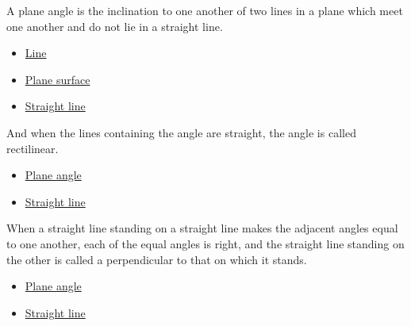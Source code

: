 \begin{definition}
\label{def:euclid-plane-angle}
A plane angle is the inclination to one another of two lines in a plane which
meet one another and do not lie in a straight line.
\end{definition}
\begin{lra-not-visible}
\begin{dependencies}
\begin{itemize}
  \item \hyperref[def:euclid-line]{Line}
  \item \hyperref[def:euclid-plane-surface]{Plane surface}
  \item \hyperref[def:euclid-straight-line]{Straight line}
\end{itemize}
\end{dependencies}
\end{lra-not-visible}

\begin{definition}
\label{def:euclid-rectilinear-angle}
And when the lines containing the angle are straight, the angle is called
rectilinear.
\end{definition}
\begin{lra-not-visible}
\begin{dependencies}
\begin{itemize}
  \item \hyperref[def:euclid-plane-angle]{Plane angle}
  \item \hyperref[def:euclid-straight-line]{Straight line}
\end{itemize}
\end{dependencies}
\end{lra-not-visible}

\begin{definition}
\label{def:euclid-right-angle-and-perpendicular}
When a straight line standing on a straight line makes the adjacent angles equal
to one another, each of the equal angles is right, and the straight line
standing on the other is called a perpendicular to that on which it stands.
\end{definition}
\begin{lra-not-visible}
\begin{dependencies}
\begin{itemize}
  \item \hyperref[def:euclid-plane-angle]{Plane angle}
  \item \hyperref[def:euclid-straight-line]{Straight line}
\end{itemize}
\end{dependencies}
\end{lra-not-visible}

